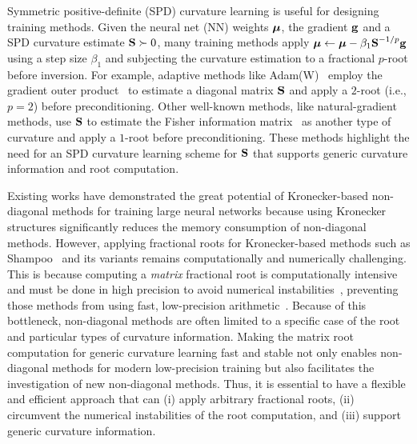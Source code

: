 %
%
\vspace{-0.2cm}
Symmetric positive-definite (SPD) curvature learning is useful for designing training methods. 
Given the neural net (NN) weights $\mbox{$\mbox{$\boldsymbol{\mu}$}$}$, the gradient $\mbox{$\mbox{$\mathbf{g}$}$}$ and a SPD curvature estimate $\mbox{$\mbox{$\mathbf{S}$}$} \succ 0$, many training methods apply $\smash{\mbox{$\mbox{$\boldsymbol{\mu}$}$} \leftarrow \mbox{$\mbox{$\boldsymbol{\mu}$}$} - \beta_1 \mbox{$\mbox{$\mathbf{S}$}$}^{-1/p}}\mbox{$\mbox{$\mathbf{g}$}$}$ using a step size $\beta_1$ and subjecting the curvature estimation to a fractional $p$-root before inversion.
For example, adaptive methods like 
Adam(W)~\citep{kingma2014adam,loshchilov2017decoupled}  employ the gradient outer product~\citep[GOP,][]{duchi2011adaptive,kingma2014adam,agarwal2019efficient} to estimate a diagonal matrix $\mbox{$\mbox{$\mathbf{S}$}$}$ and apply a $2$-root (i.e., $p=2$) before preconditioning.
Other well-known methods, like natural-gradient methods, use $\mbox{$\mbox{$\mathbf{S}$}$}$ to estimate the Fisher information   matrix~\citep{amari1998natural,roux2007topmoumoute} as another type of curvature and apply a $1$-root  before preconditioning.
These methods highlight the need for an SPD curvature learning scheme for $\mbox{$\mbox{$\mathbf{S}$}$}$ that supports generic curvature information and root computation.

Existing works \citep{martens2015optimizing,zhang2018noisy,anil2020scalable,shi2023distributed,lincan2024,vyas2024soap} have demonstrated the great potential of Kronecker-based non-diagonal methods for training large neural networks because using Kronecker structures significantly reduces the memory consumption of non-diagonal methods.
However, applying fractional roots for Kronecker-based methods such as Shampoo~\citep{gupta18shampoo,anil2020scalable,shi2023distributed} and its variants \citep{vyas2024soap} remains computationally and numerically challenging. 
This is because computing a \emph{matrix} fractional root is computationally intensive and must be done in high precision to avoid numerical instabilities~\citep{anil2020scalable,shi2023distributed}, preventing those methods from using fast, low-precision arithmetic~\citep{micikevicius2017mixed}. 
Because of this bottleneck, non-diagonal methods are often limited to
a specific case of the root and particular types of curvature information.
%
%
%
Making the matrix root computation for generic curvature learning fast and stable not only enables non-diagonal methods for modern low-precision training but also facilitates the investigation of new non-diagonal methods.
Thus, it is essential to have a flexible and efficient approach that can (i) apply arbitrary fractional roots, (ii) circumvent the numerical instabilities of the root computation, and (iii) support generic curvature information. 

